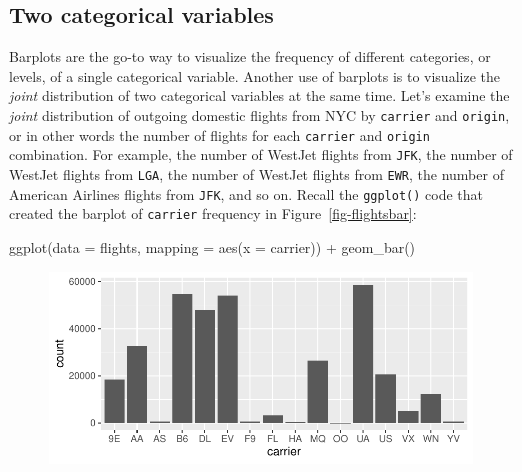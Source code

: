 \documentclass[
  letterpaper,
  DIV=11,
  numbers=noendperiod]{scrreprt}
\newenvironment{Shaded}{\begin{snugshade}}{\end{snugshade}}
\newcommand{\AttributeTok}[1]{\textcolor[rgb]{0.40,0.45,0.13}{#1}}
\newcommand{\FunctionTok}[1]{\textcolor[rgb]{0.28,0.35,0.67}{#1}}
\newcommand{\NormalTok}[1]{\textcolor[rgb]{0.00,0.23,0.31}{#1}}
\newcommand{\SpecialCharTok}[1]{\textcolor[rgb]{0.37,0.37,0.37}{#1}}
\theoremstyle{definition}
\theoremstyle{remark}
\begin{document}
\hypertarget{sec-two-categ-barplot}{%
\subsection{Two categorical variables}\label{sec-two-categ-barplot}}

Barplots are the go-to way to visualize the frequency of different
categories, or levels, of a single categorical variable. Another use of
barplots is to visualize the \emph{joint} distribution of two
categorical variables at the same time. Let's examine the \emph{joint}
distribution of outgoing domestic flights from NYC by \texttt{carrier}
and \texttt{origin}, or in other words the number of flights for each
\texttt{carrier} and \texttt{origin} combination. For example, the
number of WestJet flights from \texttt{JFK}, the number of WestJet
flights from \texttt{LGA}, the number of WestJet flights from
\texttt{EWR}, the number of American Airlines flights from \texttt{JFK},
and so on. Recall the \texttt{ggplot()} code that created the barplot of
\texttt{carrier} frequency in Figure~\ref{fig-flightsbar}:

\begin{Shaded}
\begin{Highlighting}[]
\FunctionTok{ggplot}\NormalTok{(}\AttributeTok{data =}\NormalTok{ flights, }\AttributeTok{mapping =} \FunctionTok{aes}\NormalTok{(}\AttributeTok{x =}\NormalTok{ carrier)) }\SpecialCharTok{+}
  \FunctionTok{geom\_bar}\NormalTok{()}
\end{Highlighting}
\end{Shaded}

\begin{figure}[H]

{\centering \includegraphics{02-visualization_files/figure-pdf/unnamed-chunk-43-1.pdf}

}

\end{figure}
\end{document}
